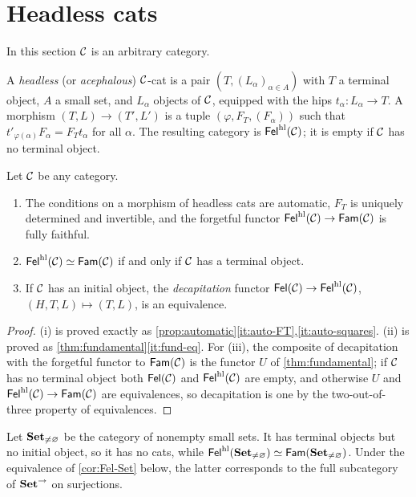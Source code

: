 \section{Headless cats}\label{sec:headless}

In this section $\mathcal{C}$ is an arbitrary category.

\begin{definition}\label{def:headless}
A \emph{headless} (or \emph{acephalous}) $\mathcal{C}$-cat is a pair
$(T,(L_\alpha)_{\alpha\in A})$ with $T$ a terminal object, $A$ a small set,
and $L_\alpha$ objects of $\mathcal{C}$, equipped with the hips $t_\alpha\colon L_\alpha\to T$.
A morphism $(T,L)\to(T',L')$ is a tuple $(\varphi,F_T,(F_\alpha))$ such that
$t'_{\varphi(\alpha)}F_\alpha=F_Tt_\alpha$ for all $\alpha$. The resulting
category is $\mathsf{Fel}^{\mathrm{hl}}(\mathcal{C})$; it is empty if $\mathcal{C}$ has no terminal object.
\end{definition}

\begin{proposition}\label{prop:headless}
Let $\mathcal{C}$ be any category.
\begin{enumerate}
\item The conditions on a morphism of headless cats are automatic, $F_T$ is
  uniquely determined and invertible, and the forgetful functor
  $\mathsf{Fel}^{\mathrm{hl}}(\mathcal{C})\to\mathsf{Fam}(\mathcal{C})$ is fully faithful.
\item $\mathsf{Fel}^{\mathrm{hl}}(\mathcal{C})\simeq\mathsf{Fam}(\mathcal{C})$ if and only if $\mathcal{C}$ has a terminal object.
\item If $\mathcal{C}$ has an initial object, the \emph{decapitation} functor
  $\mathsf{Fel}(\mathcal{C})\to\mathsf{Fel}^{\mathrm{hl}}(\mathcal{C})$, $(H,T,L)\mapsto(T,L)$, is an equivalence.
\end{enumerate}
\end{proposition}

\begin{proof}
(i) is proved exactly as \cref{prop:automatic}\ref{it:auto-FT},\ref{it:auto-squares}.
(ii) is proved as \cref{thm:fundamental}\ref{it:fund-eq}. For (iii), the
composite of decapitation with the forgetful functor to $\mathsf{Fam}(\mathcal{C})$ is the
functor $U$ of \cref{thm:fundamental}; if $\mathcal{C}$ has no terminal object both
$\mathsf{Fel}(\mathcal{C})$ and $\mathsf{Fel}^{\mathrm{hl}}(\mathcal{C})$ are empty, and otherwise $U$ and
$\mathsf{Fel}^{\mathrm{hl}}(\mathcal{C})\to\mathsf{Fam}(\mathcal{C})$ are equivalences, so decapitation is one by the
two-out-of-three property of equivalences.
\end{proof}

\begin{example}\label{ex:nonempty-sets}
Let $\mathbf{Set}_{\neq\varnothing}$ be the category of nonempty small sets. It has
terminal objects but no initial object, so it has no cats, while $\mathsf{Fel}^{\mathrm{hl}}(\mathbf{Set}_{\neq\varnothing})\simeq\mathsf{Fam}(\mathbf{Set}_{\neq\varnothing})$.
Under the equivalence of \cref{cor:Fel-Set} below, the latter corresponds to
the full subcategory of $\mathbf{Set}^{\to}$ on surjections.
\end{example}

